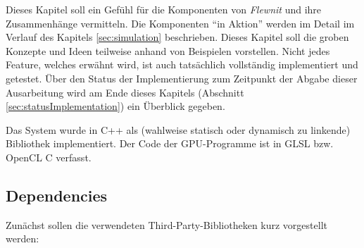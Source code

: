 
\label{sec:systemArchitecture}

Dieses Kapitel soll ein Gefühl für die Komponenten von \emph{Flewnit} und 
ihre Zusammenhänge vermitteln. Die Komponenten "`in Aktion"' werden im Detail im Verlauf des Kapitels 
\ref{sec:simulation} beschrieben.
Dieses Kapitel soll die groben Konzepte und Ideen teilweise anhand von Beispielen vorstellen.
Nicht jedes Feature, welches erwähnt wird, ist auch tatsächlich vollständig implementiert und getestet.
Über den Status der Implementierung zum Zeitpunkt der Abgabe dieser Ausarbeitung
wird am Ende dieses Kapitels (Abschnitt \ref{sec:statusImplementation}) ein Überblick gegeben.

Das System wurde in C++ als (wahlweise statisch oder dynamisch zu linkende) Bibliothek implementiert.
Der Code der GPU-Programme ist in GLSL bzw. OpenCL C verfasst.

\subsection{Dependencies}
	\label{sec:dependencies}
	
	Zunächst sollen die verwendeten Third-Party-Bibliotheken kurz vorgestellt werden:

